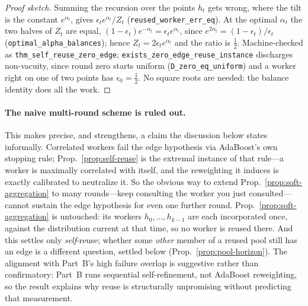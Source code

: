 \begin{proof}[Proof sketch]
Summing the recursion over the points $h_t$ gets wrong, where the tilt is the constant $e^{\alpha_t}$, gives $\epsilon_t e^{\alpha_t}/Z_t$ (\texttt{reused\_worker\_err\_eq}). At the optimal $\alpha_t$ the two halves of $Z_t$ are equal, $(1-\epsilon_t)e^{-\alpha_t}=\epsilon_te^{\alpha_t}$, since $e^{2\alpha_t}=(1-\epsilon_t)/\epsilon_t$ (\texttt{optimal\_alpha\_balances}); hence $Z_t=2\epsilon_te^{\alpha_t}$ and the ratio is $\tfrac12$. Machine-checked as \texttt{thm\_self\_reuse\_zero\_edge}; \texttt{exists\_zero\_edge\_reuse\_instance} discharges non-vacuity, since round zero starts uniform (\texttt{D\_zero\_eq\_uniform}) and a worker right on one of two points has $\epsilon_0=\tfrac12$. No square roots are needed: the balance identity does all the work.
\end{proof}

\paragraph{The naive multi-round scheme is ruled out.} This makes precise, and strengthens, a claim the discussion below states informally. Correlated workers fail the edge hypothesis via AdaBoost's own stopping rule; Prop.~\ref{prop:self-reuse} is the extremal instance of that rule---a worker is maximally correlated with itself, and the reweighting it induces is exactly calibrated to neutralize it. So the obvious way to extend Prop.~\ref{prop:soft-aggregation} to many rounds---keep consulting the worker you just consulted---cannot sustain the edge hypothesis for even one further round. Prop.~\ref{prop:soft-aggregation} is untouched: its workers $h_0,\dots,h_{k-1}$ are each incorporated once, against the distribution current at that time, so no worker is reused there. And this settles only \emph{self}-reuse; whether some \emph{other} member of a reused pool still has an edge is a different question, settled below (Prop.~\ref{prop:pool-horizon}). The alignment with Part~B's high failure overlap is suggestive rather than confirmatory: Part~B runs sequential self-refinement, not AdaBoost reweighting, so the result explains why reuse is structurally unpromising without predicting that measurement.

